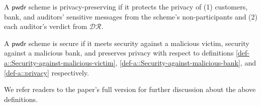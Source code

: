 \vspace{-4.2mm}

A $\mathsf{pwdr}$ scheme is privacy-preserving if it protects the privacy of (1)  customers, bank, and auditors' sensitive messages from the scheme's non-participants and (2) each auditor's verdict from $\mathcal{DR}$.%







\begin{definition}[Security]\label{def-a::PwDR-security}
A $\mathsf{pwdr}$ scheme is secure if it meets security against a malicious victim,  security against a malicious bank, and preserves privacy with respect to definitions \ref{def-a::Security-against-malicious-victim}, \ref{def-a::Security-against-malicious-bank}, and \ref{def-a::privacy} respectively. 
\end{definition}

We refer readers to the paper's full version \cite{PwDR-full-ver} for further discussion about the above definitions. 


